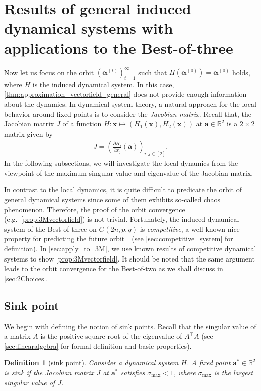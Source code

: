 \documentclass[letterpaper,11pt]{article}
\newtheorem{definition}[theorem]{Definition}
\begin{document}
\section{Results of general induced dynamical systems with applications to the Best-of-three}
\label{sec:SJacobian}
Now let us focus on the orbit $({\boldsymbol \alpha}^{(t)})_{t=1}^\infty$ such that $H({\boldsymbol \alpha}^{(0)})={\boldsymbol \alpha}^{(0)}$ holds, where $H$ is the induced dynamical system.
In this case, \cref{thm:approximation_vectorfield_general} does not provide enough information about the dynamics.
In dynamical system theory, a natural approach for the local behavior around fixed points is to consider the \emph{Jacobian matrix}.
Recall that, the Jacobian matrix $J$ of a function
$H:\mathbf{x} \mapsto (H_1(\mathbf{x}),H_2(\mathbf{x}))$ at $\mathbf{a}\in \mathbb{R}^2$ is a $2 \times 2$ matrix given by
\begin{align*}
J= \left(\frac{\partial H_i}{\partial x_j}(\mathbf{a})\right)_{i,j\in [2]}.
\end{align*}
In the following subsections, we will investigate the local dynamics from the viewpoint of the maximum singular value and eigenvalue of the Jacobian matrix.


In contrast to the local dynamics, it is quite difficult to predicate the orbit of general dynamical systems since some of them exhibits so-called chaos phenomenon.
Therefore, the proof of the orbit convergence (e.g.~\cref{prop:3Mvectorfield}) is not trivial.
Fortunately, the induced dynamical system of the Best-of-three on $G(2n,p,q)$ is \emph{competitive}, a well-known nice property for predicting the future orbit~\cite{HS05}~(see \cref{sec:competitive_system} for definition).
In \cref{sec:apply_to_3M}, we use known results of competitive dynamical systems to show \cref{prop:3Mvectorfield}.
It should be noted that the same argument leads to the orbit convergence for the Best-of-two as we shall discuss in \cref{sec:2Choices}.
\subsection{Sink point}
We begin with defining the notion of sink points.
Recall that the singular value of a matrix $A$ is the positive square root of the eigenvalue of $A^{\top}A$ (see \cref{sec:linearalgebra} for formal definition and basic properties).

\begin{definition}[sink point]
Consider a dynamical system $H$.
A fixed point $\mathbf{a}^*\in\mathbb{R}^2$ is \emph{sink} if the Jacobian matrix $J$ at $\mathbf{a}^*$ satisfies $\sigma_{\max}<1$, where $\sigma_{\max}$ is the largest singular value of $J$.
\end{definition}
\end{document}
